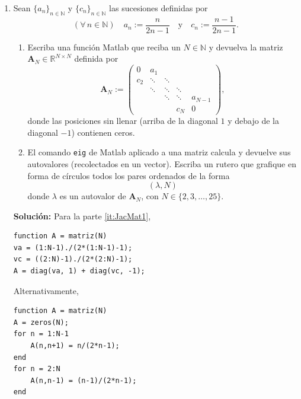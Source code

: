 \documentclass[letter,11pt]{article}
\newcommand{\matlab}{{\sc Matlab} }
\newcommand{\respuesta}[1]{
\noindent\makebox[\textwidth][r]{
\fbox{
\begin{minipage}{\textwidth}
\hfill
\vspace{#1}
\end{minipage}
}}}
\begin{document}
\begin{enumerate}
\begin{enumerate}
\respuesta{4cm}

\end{enumerate}

\item Sean $\{a_n\}_{n \in \mathbb{N}}$ y $\{c_n\}_{n \in \mathbb{N}}$ las sucesiones definidas por
%
\begin{equation*}
(\forall\,n\in\mathbb{N}) \quad a_n := \frac{n}{2n-1} \quad\text{y}\quad c_n := \frac{n-1}{2n-1}.
\end{equation*}
%
\begin{enumerate}
\item\label{it:JacMat1} Escriba una funci\'on \matlab que reciba un $N \in \mathbb{N}$ y devuelva la matriz $\boldsymbol{A}_N \in \mathbb{R}^{N \times N}$ definida por
%
\begin{equation*}
\boldsymbol{A}_N := \begin{pmatrix}
0 &a_1&&&\\
c_2&\ddots&\ddots&&\\
&\ddots&\ddots&\ddots&\\
&&\ddots &\ddots& a_{N-1}\\\
&&&c_N& 0
\end{pmatrix},
\end{equation*}
%
donde las posiciones sin llenar (arriba de la diagonal $1$ y debajo de la diagonal $-1$) contienen ceros.
\item\label{it:JacMat2} El comando \texttt{eig} de \matlab aplicado a una matriz calcula y devuelve sus autovalores (recolectados en un vector).
Escriba un rutero que grafique en forma de c\'irculos todos los pares ordenados de la forma
%
\begin{equation*}
(\lambda, N)
\end{equation*}
%
donde $\lambda$ es un autovalor de $\boldsymbol{A}_N$, con $N \in \{2, 3, \dotsc, 25\}$.
\end{enumerate}

\textbf{Soluci\'on:} Para la parte \ref{it:JacMat1},
\begin{lstlisting}
function A = matriz(N)
va = (1:N-1)./(2*(1:N-1)-1);
vc = ((2:N)-1)./(2*(2:N)-1);
A = diag(va, 1) + diag(vc, -1);
\end{lstlisting}
Alternativamente,
\begin{lstlisting}
function A = matriz(N)
A = zeros(N);
for n = 1:N-1
    A(n,n+1) = n/(2*n-1);
end
for n = 2:N
    A(n,n-1) = (n-1)/(2*n-1);
end
\end{lstlisting}


\end{enumerate}
\end{document}
